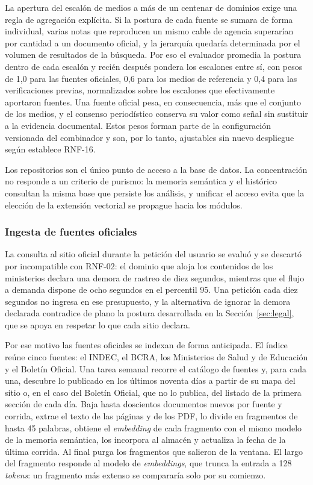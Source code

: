 La apertura del escalón de medios a más de un centenar de dominios exige una regla de agregación explícita. Si la postura de cada fuente se sumara de forma individual, varias notas que reproducen un mismo cable de agencia superarían por cantidad a un documento oficial, y la jerarquía quedaría determinada por el volumen de resultados de la búsqueda. Por eso el evaluador promedia la postura dentro de cada escalón y recién después pondera los escalones entre sí, con pesos de 1,0 para las fuentes oficiales, 0,6 para los medios de referencia y 0,4 para las verificaciones previas, normalizados sobre los escalones que efectivamente aportaron fuentes. Una fuente oficial pesa, en consecuencia, más que el conjunto de los medios, y el consenso periodístico conserva su valor como señal sin sustituir a la evidencia documental. Estos pesos forman parte de la configuración versionada del combinador y son, por lo tanto, ajustables sin nuevo despliegue según establece RNF-16.

Los repositorios son el único punto de acceso a la base de datos. La concentración no responde a un criterio de purismo: la memoria semántica y el histórico consultan la misma base que persiste los análisis, y unificar el acceso evita que la elección de la extensión vectorial se propague hacia los módulos.

\subsubsection{Ingesta de fuentes oficiales}
\label{sec:ingesta}

La consulta al sitio oficial durante la petición del usuario se evaluó y se descartó por incompatible con RNF-02: el dominio que aloja los contenidos de los ministerios declara una demora de rastreo de diez segundos, mientras que el flujo a demanda dispone de ocho segundos en el percentil 95. Una petición cada diez segundos no ingresa en ese presupuesto, y la alternativa de ignorar la demora declarada contradice de plano la postura desarrollada en la Sección~\ref{sec:legal}, que se apoya en respetar lo que cada sitio declara.

Por ese motivo las fuentes oficiales se indexan de forma anticipada. El índice reúne cinco fuentes: el INDEC, el BCRA, los Ministerios de Salud y de Educación y el Boletín Oficial. Una tarea semanal recorre el catálogo de fuentes y, para cada una, descubre lo publicado en los últimos noventa días a partir de su mapa del sitio o, en el caso del Boletín Oficial, que no lo publica, del listado de la primera sección de cada día. Baja hasta doscientos documentos nuevos por fuente y corrida, extrae el texto de las páginas y de los PDF, lo divide en fragmentos de hasta 45 palabras, obtiene el \textit{embedding} de cada fragmento con el mismo modelo de la memoria semántica, los incorpora al almacén y actualiza la fecha de la última corrida. Al final purga los fragmentos que salieron de la ventana. El largo del fragmento responde al modelo de \textit{embeddings}, que trunca la entrada a 128 \textit{tokens}: un fragmento más extenso se compararía solo por su comienzo.

